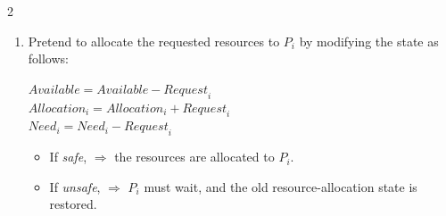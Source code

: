 \begin{multicols}{2}
\begin{enumerate}[itemsep=1em]
    \item Pretend to allocate the requested resources to $P_i$ by modifying the state as follows:
    
      ${Available} = {Available} - {Request}_i$ \\
      ${Allocation}_i = {Allocation}_i + {Request}_i$ \\
      ${Need}_i = {Need}_i - {Request}_i$

   \vspace{1em}
   \begin{itemize}[leftmargin=*, noitemsep]
       \item If \emph{safe}, $\Rightarrow$ the resources are allocated to $P_i$.
       \item If \emph{unsafe}, $\Rightarrow$ $P_i$ must wait, and the old resource-allocation state is restored.
   \end{itemize}
\end{enumerate}
\end{multicols}